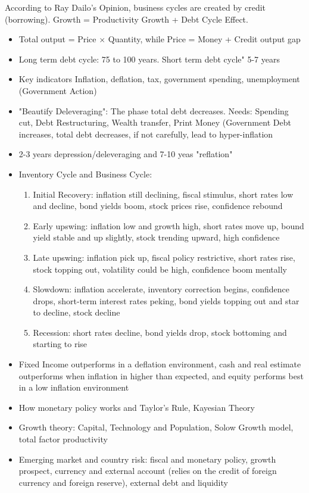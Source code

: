 \documentclass[11pt, openany]{book}              %
\begin{document}
According to Ray Dailo's Opinion, business cycles are created by credit (borrowing). Growth = Productivity Growth + Debt Cycle Effect.  

\begin{itemize}
	\item Total output = Price $\times$ Quantity, while Price = Money + Credit
		\subitem output gap
	\item Long term debt cycle: 75 to 100 years. Short term debt cycle" 5-7 years
	\item Key indicators Inflation, deflation, tax, government spending, unemployment (Government Action)
	\item "Beautify Deleveraging": The phase total debt decreases. Needs: Spending cut, Debt Restructuring, Wealth transfer, Print Money (Government Debt increases, total debt decreases, if not carefully, lead to hyper-inflation
	\item 2-3 years depression/deleveraging and 7-10 yeas "reflation"
	\item Inventory Cycle and Business Cycle:
	\subitem \begin{enumerate}
		\item Initial Recovery: inflation still declining, fiscal stimulus, short rates low and decline, bond yields boom, stock prices rise, confidence rebound
		\item Early upswing: inflation low and growth high, short rates move up, bound yield stable and up slightly, stock trending upward, high confidence
		\item Late upswing: inflation pick up, fiscal policy restrictive, short rates rise, stock topping out, volatility could be high, confidence boom mentally
		\item Slowdown: inflation accelerate, inventory correction begins, confidence drops, short-term interest rates peking, bond yields topping out and star to decline, stock decline
		\item Recession: short rates decline, bond yields drop, stock bottoming and starting to rise
	\end{enumerate}
	\item Fixed Income outperforms in a deflation environment, cash and real estimate outperforms when inflation in higher than expected, and equity performs best in a low inflation environment 
	\item How monetary policy works and Taylor's Rule, Kayesian Theory 
	\item Growth theory: Capital, Technology and Population, Solow Growth model, total factor productivity 
	\item Emerging market and country risk: fiscal and monetary policy, growth prospect, currency and external account (relies on the credit of foreign currency and foreign reserve), external debt and liquidity
\end{itemize}
\end{document}
